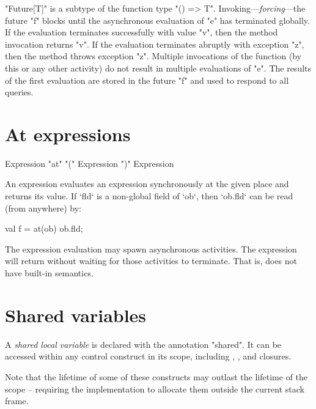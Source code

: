 \xcd"Future[T]" is a subtype of the function type \xcd"() => T".
Invoking---\emph{forcing}---the future \xcd"f" blocks until the
asynchronous evaluation of \xcd"e" has terminated globally. If the
evaluation terminates successfully with value \xcd"v", then the method
invocation returns \xcd"v". If the evaluation terminates abruptly with
exception \xcd"z", then the method throws exception \xcd"z". Multiple
invocations of the function (by this or any other activity) do not
result in multiple evaluations of \xcd"e". The results of the first
evaluation are stored in the future \xcd"f" and used to respond to all
queries.




\section{At expressions}

\begin{grammar}
Expression \: \xcd"at" \xcd"(" Expression \xcd")" Expression
\end{grammar}

An  expression evaluates an expression synchronously at the
given place and returns its value.  If \xcd`fld` is a non-global field of 
\xcd`ob`, then \xcd`ob.fld` can be read (from anywhere) by: 
\begin{xten}
val f = at(ob) ob.fld;
\end{xten}





The expression evaluation may spawn asynchronous activities. The 
expression will return without waiting for those activities to terminate. That
is,  does not have built-in  semantics.

\section{Shared variables}
\label{Shared}


A {\em shared local variable} is declared with the annotation \xcd"shared".
It can be accessed within any control construct in its scope, including
, ,  and closures.

Note that the lifetime of some of these constructs may outlast the
lifetime of the scope -- requiring the implementation to allocate them
outside the current stack frame.

